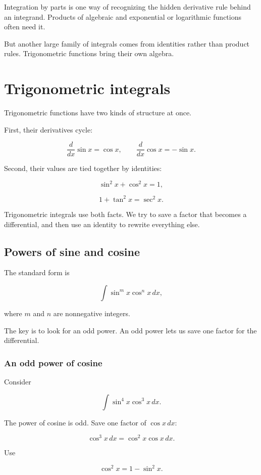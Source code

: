 Integration by parts is one way of recognizing the hidden derivative rule behind an
integrand.  Products of algebraic and exponential or logarithmic functions often need it.

But another large family of integrals comes from identities rather than product rules.
Trigonometric functions bring their own algebra.

\section{Trigonometric integrals}
\label{sec:trigonometric-integrals}

Trigonometric functions have two kinds of structure at once.

First, their derivatives cycle:

\[
\frac{d}{dx}\sin x=\cos x,
\qquad
\frac{d}{dx}\cos x=-\sin x.
\]

Second, their values are tied together by identities:

\[
\sin^2 x+\cos^2 x=1,
\]

\[
1+\tan^2 x=\sec^2 x.
\]

Trigonometric integrals use both facts.  We try to save a factor that becomes a
differential, and then use an identity to rewrite everything else.

\subsection{Powers of sine and cosine}
\label{subsec:powers-sine-cosine}

The standard form is

\[
\int \sin^m x\cos^n x\,dx,
\]

where \(m\) and \(n\) are nonnegative integers.

The key is to look for an odd power.  An odd power lets us save one factor for the
differential.

\subsubsection*{An odd power of cosine}

Consider

\[
\int \sin^4 x\cos^3 x\,dx.
\]

The power of cosine is odd.  Save one factor of \(\cos x\,dx\):

\[
\cos^3 x\,dx=\cos^2 x\cos x\,dx.
\]

Use

\[
\cos^2 x=1-\sin^2 x.
\]


